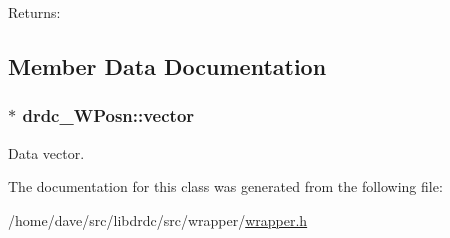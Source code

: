 \begin{Desc}
\item[Returns:]\end{Desc}


\subsection{Member Data Documentation}
\hypertarget{classdrdc__WPosn_635738b33966d90cc50ea00a4f1a0aa4}{
\subsubsection[vector]{$\ast$ {\bf drdc\_\-WPosn::vector}}}
\label{classdrdc__WPosn_635738b33966d90cc50ea00a4f1a0aa4}


Data vector. 



The documentation for this class was generated from the following file:\begin{CompactItemize}
\item 
/home/dave/src/libdrdc/src/wrapper/\hyperlink{wrapper_8h}{wrapper.h}\end{CompactItemize}
